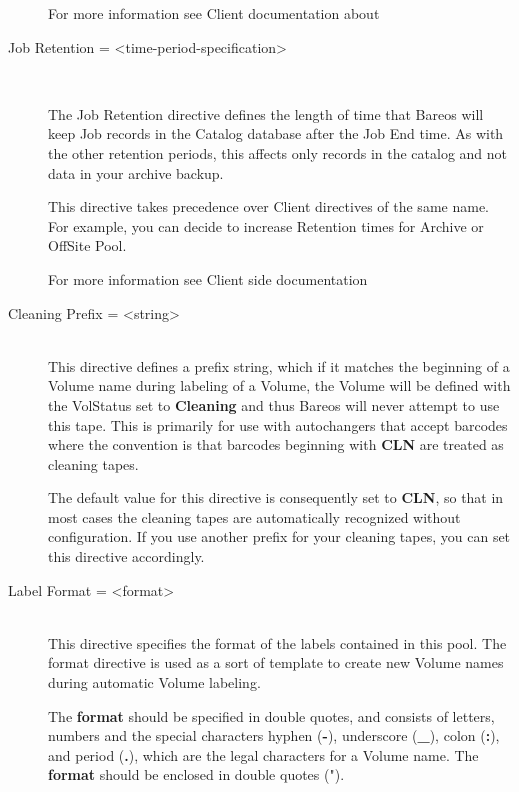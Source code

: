 \begin{description}
For more information see Client documentation about

\item [Job Retention = {\textless}time-period-specification{\textgreater}] \hfill \\

The Job Retention directive defines the length of time that Bareos will keep
Job records in the Catalog database after the Job End time.  As with the
other retention periods, this affects only records in the catalog and not
data in your archive backup.

This directive takes precedence over Client directives of the same name.
For example, you can decide to increase Retention times for Archive or
OffSite Pool.

For more information see Client side documentation

\item [Cleaning Prefix = {\textless}string{\textgreater}] \hfill \\
This directive defines a prefix string, which if it matches the
beginning of a Volume name during labeling of a Volume, the Volume will
be defined with the VolStatus set to {\bf Cleaning} and thus Bareos will
never attempt to use this tape.  This is primarily for use with
autochangers that accept barcodes where the convention is that barcodes
beginning with {\bf CLN} are treated as cleaning tapes.

The default value for this directive is consequently set to {\bf CLN}, so
that in most cases the cleaning tapes are automatically recognized without
configuration.
If you use another prefix for your cleaning tapes, you can set this directive
accordingly.

\label{Label}
\item [Label Format = {\textless}format{\textgreater}] \hfill \\
This directive specifies the format of the labels contained in this
pool.  The format directive is used as a sort of template to create new
Volume names during automatic Volume labeling.

The {\bf format} should be specified in double quotes, and consists of
letters, numbers and the special characters hyphen ({\bf -}), underscore
({\bf \_}), colon ({\bf :}), and period ({\bf .}), which are the legal
characters for a Volume name.  The {\bf format} should be enclosed in
double quotes (").


\end{description}
